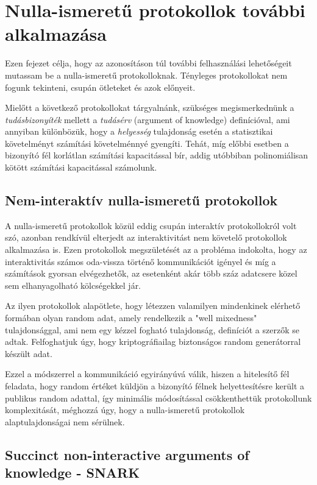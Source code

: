 \chapter{Nulla-ismeretű protokollok további alkalmazása}

Ezen fejezet célja, hogy az azonosításon túl további felhasználási lehetőségeit mutassam be a nulla-ismeretű protokolloknak. Tényleges protokollokat nem fogunk tekinteni, csupán ötleteket és azok előnyeit.

Mielőtt a következő protokollokat tárgyalnánk, szükséges megismerkednünk a \textit{tudásbizonyíték} mellett a \textit{tudásérv} (argument of knowledge) definícióval, ami annyiban különbözük, hogy a \textit{helyesség} tulajdonság esetén a statisztikai követelményt számítási követelménnyé gyengíti. Tehát, míg előbbi esetben a bizonyító fél korlátlan számítási kapacitással bír, addig utóbbiban polinomiálisan kötött számítási kapacitással számolunk.

\section{Nem-interaktív nulla-ismeretű protokollok}

A nulla-ismeretű protokollok közül eddig csupán interaktív protokollokról volt szó, azonban rendkívül elterjedt az interaktivitást nem követelő protokollok alkalmazása is. Ezen protokollok megszületését az a probléma indokolta, hogy az interaktivitás számos oda-vissza történő kommunikációt igényel és míg a számítások gyorsan elvégezhetők, az esetenként akár több száz adatcsere közel sem elhanyagolható kölcségekkel jár. 

Az ilyen protokollok \cite{NIZK, NIZK2} alapötlete, hogy létezzen valamilyen mindenkinek elérhető formában olyan random adat, amely rendelkezik a "well mixedness" tulajdonsággal, ami nem egy kézzel fogható tulajdonság, definíciót a szerzők se adtak. Felfoghatjuk úgy, hogy kriptográfiailag biztonságos random generátorral készült adat.

Ezzel a módszerrel a kommunikáció egyirányúvá válik, hiszen a hitelesítő fél feladata, hogy random értéket küldjön a bizonyító félnek helyettesítésre került a publikus random adattal, így minimális módosítással csökkenthettük protokollunk komplexitását, méghozzá úgy, hogy a nulla-ismeretű protokollok alaptulajdonságai nem sérülnek.

\section{Succinct non-interactive arguments of knowledge - SNARK}

